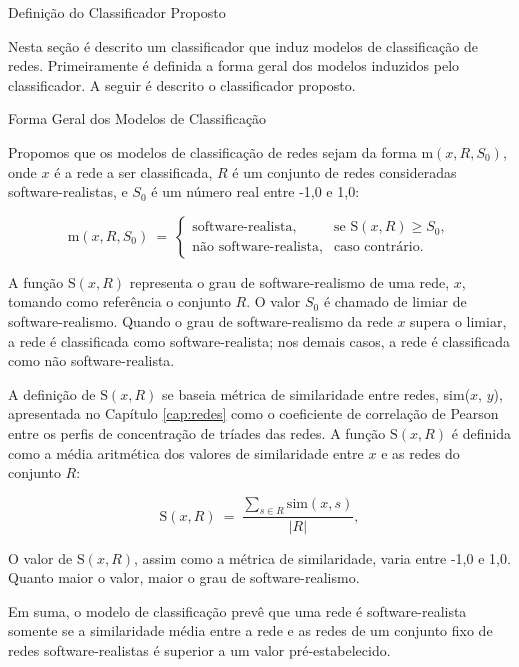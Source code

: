 \begin{section}{Definição do Classificador Proposto} \label{cap:clas2}
	
	Nesta seção é descrito um classificador que induz modelos de classificação de redes. Primeiramente é definida a forma geral dos modelos induzidos pelo classificador. A seguir é descrito o classificador proposto.
	
\begin{subsection}{Forma Geral dos Modelos de Classificação}
	
	Propomos que os modelos de classificação de redes sejam da forma $\mathrm{m}(x, R, S_0)$, onde $x$ é a rede a ser classificada, $R$ é um conjunto de redes consideradas software-realistas, e $S_0$ é um número real entre -1,0 e 1,0:
	
$$
	\mathrm{m}(x, R, S_0) ~=~
	\left\{
	\begin{array}{cl}
	\mbox{software-realista,} & \mbox{se } \mathrm{S}(x, R) \ge S_0, \\
	\mbox{não software-realista,} & \mbox{caso contrário.}
	\end{array}
	\right.
$$
	
	A função $\mathrm{S}(x, R)$ representa o grau de software-realismo de uma rede, $x$, tomando como referência o conjunto $R$. O valor $S_0$ é chamado de limiar de software-realismo. Quando o grau de software-realismo da rede $x$ supera o limiar, a rede é classificada como software-realista; nos demais casos, a rede é classificada como não software-realista.
	
	A definição de $\mathrm{S}(x, R)$ se baseia métrica de similaridade entre redes, sim($x$, $y$), apresentada no Capítulo \ref{cap:redes} como o coeficiente de correlação de Pearson entre os perfis de concentração de tríades das redes. A função $\mathrm{S}(x, R)$ é definida como a média aritmética dos valores de similaridade entre $x$ e as redes do conjunto $R$:

	$$
	\mathrm{S}(x, R) ~=~ \frac{
	\displaystyle\sum_{s \in R} \mathrm{sim}(x, s)
	}{|R|} \mathrm{,}
	$$

	O valor de $\mathrm{S}(x, R)$, assim como a métrica de similaridade, varia entre -1,0 e 1,0. Quanto maior o valor, maior o grau de software-realismo.
	
	Em suma, o modelo de classificação prevê que uma rede é software-realista somente se a similaridade média entre a rede e as redes de um conjunto fixo de redes software-realistas é superior a um valor pré-estabelecido.
	

\end{subsection}
\end{section}
